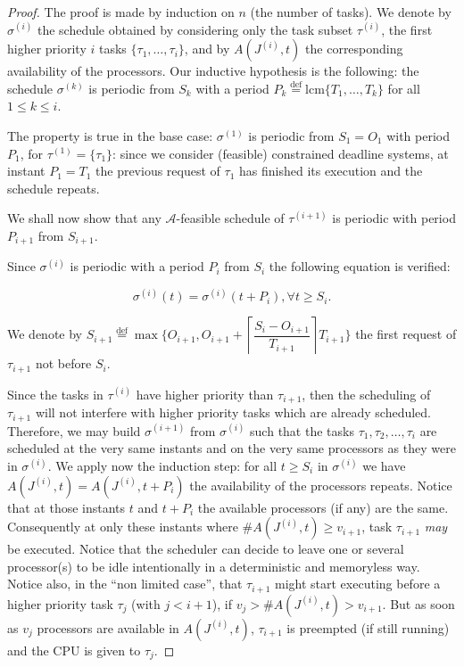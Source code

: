 \documentclass[a4paper]{article}
\newcommand{\equals}{\stackrel{\mathrm{def}}{=}}
\newcommand{\lcm}{\mathrm{lcm}}
\begin{document}
\begin{proof}
  The proof is made by induction on $n$ (the number of tasks). We denote by $\sigma^{(i)}$ the schedule obtained by considering only the task subset $\tau^{(i)}$, the first higher priority $i$ tasks $\{\tau_1, \ldots, \tau_i \}$, and by $A(J^{(i)}, t)$ the corresponding availability of the processors. Our inductive hypothesis is the following: the schedule $\sigma^{(k)}$ is periodic from $S_k$ with a period $P_k \equals \lcm\{T_{1}, \ldots, T_{k}\}$ for all $1 \leq k \leq i$.

  The property is true in the base case: $\sigma^{(1)}$ is periodic from $S_1=O_1$ with period $P_1$, for $\tau^{(1)}= \{\tau_1 \}$:  since we consider (feasible) constrained deadline systems, at instant $P_1=T_1$ the  previous request of $\tau_1$ has finished its execution and the  schedule repeats.

  We shall now show that any $\mathcal{A}$-feasible schedule of $\tau^{(i+1)}$ is  periodic with period $P_{i+1}$ from $S_{i+1}$.

  Since $\sigma^{(i)}$ is periodic with a period $P_{i}$ from $S_{i}$ the  following equation is verified:

\begin{equation}
  \label{eq:stateInter}
\sigma^{(i)}(t)=\sigma^{(i)}(t+P_i), \forall t \geq S_{i}.
\end{equation}

We denote by $S_{i+1} \equals \max \{ O_{i+1}, O_{i+1}+ \left\lceil \dfrac{S_{i}-O_{i+1}}{T_{i+1}} \right\rceil T_{i+1} \}$ the first request of $\tau_{i+1}$ not before $S_i$.

Since the tasks in $\tau^{(i)}$ have higher priority than $\tau_{i+1}$, then the scheduling of $\tau_{i+1}$ will not interfere with higher priority tasks which are already scheduled. Therefore, we may build $\sigma^{(i+1)}$ from $\sigma^{(i)}$ such that the tasks $\tau_1, \tau_2, \ldots, \tau_i$ are scheduled at the very same instants and on the very same processors as they were in $\sigma^{(i)}$. We apply now the induction step: for all $t \geq S_{i}$ in $\sigma^{(i)}$ we have $A(J^{(i)},t) = A(J^{(i)}, t +P_i)$ the availability of the processors repeats. Notice that at those instants $t$ and $t+P_i$ the available processors (if any) are the same. Consequently at only these instants where $\#A(J^{(i)},t)\ge v_{i+1}$, task $\tau_{i+1}$ {\em may} be executed. Notice that the scheduler can decide to leave one or several processor(s) to be idle intentionally in a deterministic and memoryless way. Notice also, in the ``non limited case'', that $\tau_{i+1}$ might start executing before a higher priority task $\tau_j$ (with $j<i+1$), if $v_j>\#A(J^{(i)},t)>v_{i+1}$. But as soon as $v_j$ processors are available in $A(J^{(i)}, t)$, $\tau_{i+1}$ is preempted (if still running) and the CPU is given to $\tau_j$.  


\end{proof}
\end{document}
